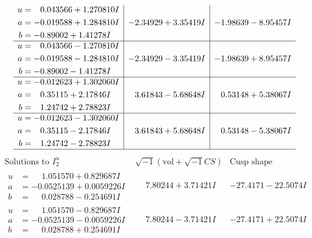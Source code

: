\documentclass[1p]{elsarticle_modified}
\theoremstyle{definition}
\newcommand{\I}{\sqrt{-1}}
\begin{document}
$$\begin{array}{c|c|c}
\begin{aligned}
u &= \phantom{-}0.043566 + 1.270810 I \\
a &= -0.019588 + 1.284810 I \\
b &= -0.89002 + 1.41278 I\end{aligned}
 & -2.34929 + 3.35419 I & -1.98639 - 8.95457 I \\ \hline\begin{aligned}
u &= \phantom{-}0.043566 - 1.270810 I \\
a &= -0.019588 - 1.284810 I \\
b &= -0.89002 - 1.41278 I\end{aligned}
 & -2.34929 - 3.35419 I & -1.98639 + 8.95457 I \\ \hline\begin{aligned}
u &= -0.012623 + 1.302060 I \\
a &= \phantom{-}0.35115 + 2.17846 I \\
b &= \phantom{-}1.24742 + 2.78823 I\end{aligned}
 & \phantom{-}3.61843 - 5.68648 I & \phantom{-}0.53148 + 5.38067 I \\ \hline\begin{aligned}
u &= -0.012623 - 1.302060 I \\
a &= \phantom{-}0.35115 - 2.17846 I \\
b &= \phantom{-}1.24742 - 2.78823 I\end{aligned}
 & \phantom{-}3.61843 + 5.68648 I & \phantom{-}0.53148 - 5.38067 I\\
 \hline 
 \end{array}$$\newpage$$\begin{array}{c|c|c}  
\text{Solutions to }I^u_{2}& \I (\text{vol} + \sqrt{-1}CS) & \text{Cusp shape}\\
 \hline 
\begin{aligned}
u &= \phantom{-}1.051570 + 0.829687 I \\
a &= -0.0525139 + 0.0059226 I \\
b &= \phantom{-}0.028788 - 0.254691 I\end{aligned}
 & \phantom{-}7.80244 + 3.71421 I & -27.4171 - 22.5074 I \\ \hline\begin{aligned}
u &= \phantom{-}1.051570 - 0.829687 I \\
a &= -0.0525139 - 0.0059226 I \\
b &= \phantom{-}0.028788 + 0.254691 I\end{aligned}
 & \phantom{-}7.80244 - 3.71421 I & -27.4171 + 22.5074 I \\ \hline\begin{aligned}

\end{aligned}
\end{array}$$
\end{document}
